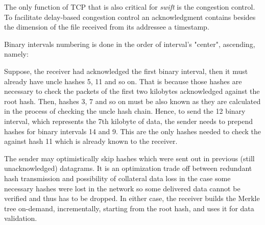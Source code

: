 The only function of TCP that is also critical for \emph{swift} is the congestion control. To facilitate delay-based 
congestion control an acknowledgment contains besides the dimension of the file received from its addressee a timestamp.

Binary intervals numbering is done in the order of interval's "center", ascending, namely:


%
%
%


Suppose, the receiver had acknowledged the first binary interval, then it must already have uncle hashes 5, 11 and so on. 
That is because those hashes are necessary to check the packets of the first two kilobytes acknowledged against the 
root hash. Then, hashes 3, 7 and so on must be also known as they are calculated in the process of checking the uncle
hash chain. Hence, to send the 12 binary interval, which represents the 7th kilobyte of data, the sender needs to
prepend hashes for binary intervals 14 and 9. This are the only hashes needed to check the against hash 11 which is
already known to the receiver.

The sender may optimistically skip hashes which were sent out in previous (still unacknowledged) datagrams. It is an 
optimization trade off between redundant hash transmission and possibility of collateral data loss in the case some
necessary hashes were lost in the network so some delivered data cannot be verified and thus has to be dropped. In
either case, the receiver builds the Merkle tree on-demand, incrementally, starting from the root hash, and uses it for
data validation.

